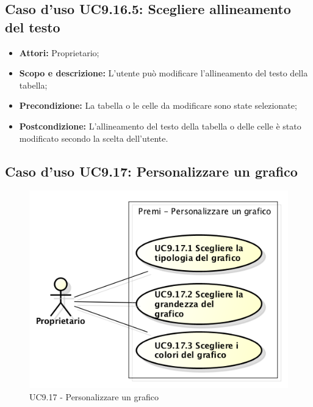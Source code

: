 	\subsection{Caso d'uso UC9.16.5: Scegliere allineamento del testo}
	\begin{itemize}
		\item \textbf{Attori:} Proprietario;
		\item \textbf{Scopo e descrizione:} L'utente può modificare l'allineamento del testo della tabella;
		\item \textbf{Precondizione:} La tabella o le celle da modificare sono state selezionate;
		\item \textbf{Postcondizione:} L'allineamento del testo della tabella o delle celle è stato modificato secondo la scelta dell'utente.
	\end{itemize}
	
	
	\subsection{Caso d'uso UC9.17: Personalizzare un grafico}
	\begin{figure}[h] 
		\centering 
		\includegraphics[scale=0.45] {img/UC9.17.png} 
		\caption{UC9.17 - Personalizzare un grafico} 
	\end{figure}
	
